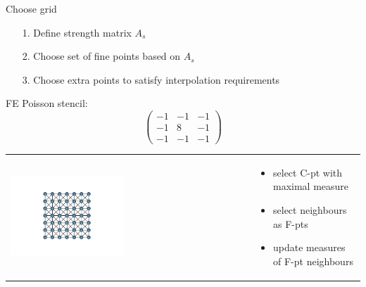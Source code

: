 \documentclass{beamer}
\begin{document}
\begin{frame}



Choose grid
\begin{itemize}
  \item[1.] Define strength matrix $A_s$
  \item[2.] Choose set of fine points based on $A_s$
  \item[3.] Choose extra points to satisfy interpolation requirements
\end{itemize}

\vspace{.5in}

FE Poisson stencil:
\begin{equation} \nonumber
 \begin{pmatrix}
     -1 &-1&-1\\
     -1 &8&-1\\
     -1 &-1&-1
   \end{pmatrix}
\end{equation}
\end{frame}

\begin{frame}

\begin{tabular}{ p{} p{}}

\hspace{5mm} \includegraphics[trim = 85mm 40mm 85mm  40mm, clip, width=0.48\textwidth]{../figures/AMG1.png} &

\vspace{-1.75in}

\begin{itemize}
  \item select C-pt with maximal measure
  \item select neighbours as F-pts
  \item update measures of F-pt neighbours

\end{itemize}

\end{tabular}

\end{frame}
\end{document}
